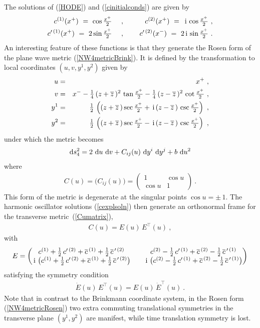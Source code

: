 \documentclass[11pt,a4paper]{article}
\newcommand{\ii}{{\rm i}}
\def\ii{{\,{\rm i}\,}}
\def\dd{{\rm d}}
\def\nn{\nonumber}
\def\bea{\begin{eqnarray}}
\def\eea{\end{eqnarray}}
\newcommand{\beq}{\begin{eqnarray}}
\newcommand{\eeq}{\end{eqnarray}}
\begin{document}
The solutions of (\ref{HODE}) and (\ref{cinitialconds}) are given by
\bea
c^{(1)}(x^+)~=~\cos\mbox{$\frac{x^+}2$} ~~~~ &,& ~~~~
c^{(2)}(x^+)~=~\ii\cos\mbox{$\frac{x^+}2$} \ , \nn\\
c^{\prime\,(1)}(x^+)~=~2\sin\mbox{$\frac{x^+}2$} ~~~~ &,& ~~~~
c^{\prime\,(2)}(x^-)~=~2\ii\sin\mbox{$\frac{x^+}2$} \ .
\label{cexplsoln}\eea
An interesting feature of these functions is that they generate the
Rosen form of the plane wave metric (\ref{NW4metricBrink}). It is
defined by the transformation to local coordinates $(u,v,y^1,y^2)$
given by
\bea
u&=&x^+ \ , \nn\\v&=&x^--\mbox{$\frac14$}\,(z+\overline{z}\,)^2\,
\tan\mbox{$\frac{x^+}2$}-\mbox{$\frac14$}\,(z-\overline{z}\,)^2\,
\cot\mbox{$\frac{x^+}2$} \ , \nn\\y^1&=&\mbox{$\frac12$}\,
\left((z+\overline{z}\,)\sec\mbox{$\frac{x^+}2$}+\ii(z-\overline{z}\,)
\,\csc\mbox{$\frac{x^+}2$}\right) \ , \nn\\y^2&=&\mbox{$\frac12$}\,
\left((z+\overline{z}\,)\sec\mbox{$\frac{x^+}2$}-\ii(z-\overline{z}\,)
\,\csc\mbox{$\frac{x^+}2$}\right) \ ,
\label{Rosen}\eeq
under which the metric becomes
\beq
\dd s_4^2=2~\dd u~\dd v+C_{ij}(u)~\dd y^i~\dd y^j+b~\dd u^2
\label{NW4metricRosen}\eeq
where
\beq
C(u)=\bigl(C_{ij}(u)\bigr)=\begin{pmatrix}1&\cos u\\\cos
  u&1\end{pmatrix} \ .
\label{Cumatrix}\eeq
This form of the metric is degenerate at the singular points $\cos u=\pm\,1$.
The harmonic oscillator solutions (\ref{cexplsoln}) then generate an
orthonormal frame for the transverse metric~(\ref{Cumatrix}),
\beq
C(u)=E(u)\,E^\top(u) \ ,
\label{CQrel}\eeq
with
\beq
E=\begin{pmatrix}c^{(1)}+\mbox{$\frac12$}\,c^{\prime\,(2)}+
\overline{c}^{\,(1)}+\mbox{$\frac12$}\,\overline{c}^{\,\prime
\,(2)}& &c^{(2)}-\mbox{$\frac12$}\,c^{\prime\,(1)}+
\overline{c}^{\,(2)}-\mbox{$\frac12$}\,\overline{c}^{\,\prime
\,(1)}\\\ii\left(c^{(1)}+\mbox{$\frac12$}\,c^{\prime\,(2)}+
\overline{c}^{\,(1)}+\mbox{$\frac12$}\,\overline{c}^{\,\prime
\,(2)}\right)& &\ii\left(c^{(2)}-\mbox{$\frac12$}\,c^{\prime\,(1)}+
\overline{c}^{\,(2)}-\mbox{$\frac12$}\,\overline{c}^{\,\prime
\,(1)}\right)\end{pmatrix}
\label{Qvielbein}\eeq
satisfying the symmetry condition
\beq
\dot E(u)\,E^\top(u)=E(u)\,\dot E^\top(u) \ .
\label{Esymcond}\eeq
Note that in contrast to the Brinkmann coordinate system, in the Rosen
form (\ref{NW4metricRosen}) two extra commuting translational
symmetries in the transverse plane $(y^1,y^2)$ are manifest, while
time translation symmetry is lost.
\end{document}
